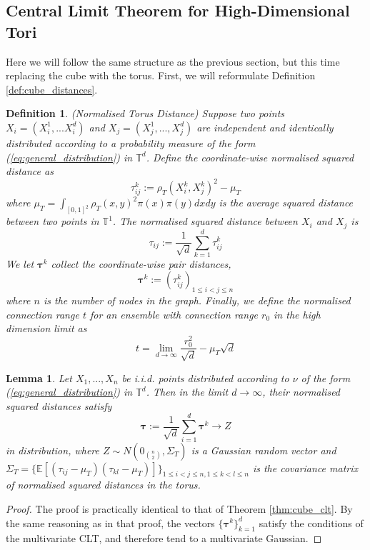 \documentclass{article}
\newtheorem{definition}{Definition}
\newtheorem{lemma}{Lemma}
\newcommand{\tti}{\rightarrow\infty}
\begin{document}
\subsection{Central Limit Theorem for High-Dimensional Tori}
Here we will follow the same structure as the previous section, but this time replacing the cube with the torus. First, we will reformulate Definition \ref{def:cube_distances}.
\begin{definition}(Normalised Torus Distance)
    \label{def:torus_distances}
    Suppose two points $X_i = (X_i^1,...X_i^d)$ and $X_j = (X_j^1,...,X_j^d)$ are independent and identically distributed according to a probability measure of the form (\ref{eq:general_distribution}) in $\mathbb{T}^d$. Define the coordinate-wise  normalised squared distance  as
    \begin{equation}
        \tau_{ij}^k := \rho_T(X_i^k,X_j^k)^2 - \mu_T
    \end{equation}
    where $\mu_T = \int_{[0,1]^2} \rho_T(x,y)^2 \pi(x)\pi(y)dxdy$ is the average squared distance between two points in $\mathbb{T}^1$. The  normalised squared distance  between $X_i$ and $X_j$ is
    \begin{equation}
        \tau_{ij} := \frac{1}{\sqrt{d}}\sum_{k=1}^d \tau_{ij}^k
    \end{equation}
    We let $\boldsymbol{\tau}^k$ collect the coordinate-wise pair distances,
    \begin{equation}
        \boldsymbol{\tau}^k := (\tau_{ij}^k)_{1\leq i < j \leq n}
    \end{equation}
    where $n$ is the number of nodes in the graph. Finally, we define the normalised connection range $t$ for an ensemble with connection range $r_0$ in the high dimension limit as
    \begin{equation}
        t = \lim_{d\tti} \frac{r_0^2}{\sqrt{d}}-\mu_T\sqrt{d}
    \end{equation}
\end{definition}
\begin{lemma}
    \label{thm:torus_clt}
    Let $X_1,...,X_n$ be i.i.d. points distributed according to $\nu$ of the form (\ref{eq:general_distribution}) in $\mathbb{T}^d$. Then in the limit $d\tti$, their  normalised squared distances  satisfy
    \begin{equation}
        \boldsymbol{\tau} := \frac{1}{\sqrt{d}} \sum_{i=1}^d \boldsymbol{\tau}^k \rightarrow Z
    \end{equation}
    in distribution, where $Z \sim N(0_{\binom{n}{2}}, \Sigma_T)$ is a Gaussian random vector and $\Sigma_T = \{\mathbb{E}[(\tau_{ij}-\mu_T)(\tau_{kl}-\mu_T)]\}_{1\leq i<j\leq n, 1\leq k<l \leq n}$ is the covariance matrix of  normalised squared distances  in the torus.
\end{lemma}
\begin{proof}
    The proof is practically identical to that of Theorem \ref{thm:cube_clt}. By the same reasoning as in that proof, the vectors $\{\boldsymbol{\tau}^k\}_{k=1}^d$ satisfy the conditions of the multivariate CLT, and therefore tend to a multivariate Gaussian.
\end{proof}
\end{document}
